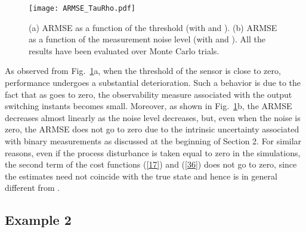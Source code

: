 \documentclass[11pt,journal,onecolumn]{IEEEtran}
\begin{document}
\begin{figure}[tb]
\centering
\texttt{[image: ARMSE\_TauRho.pdf]}
\caption{(a) ARMSE as a function of the threshold  (with  and ). (b) ARMSE as a function of the measurement noise level  (with  and ).
All the results have been evaluated over  Monte Carlo trials.}
\label{fig:ARMSE}
\end{figure}
As observed from Fig.~\ref{fig:ARMSE}a, when the threshold of the sensor is close to zero, performance undergoes a substantial deterioration.
Such a behavior is due to the fact that as  goes to zero, the observability measure  associated with the output switching instants becomes small. Moreover, as shown in Fig.~\ref{fig:ARMSE}b, the ARMSE decreases almost linearly as the noise level decreases, but, even when the noise is zero, the ARMSE does not go to zero due to the intrinsic uncertainty associated with binary measurements as discussed at the beginning of Section 2.
For similar reasons, even if the process disturbance is taken equal to zero in the simulations, the second term of the cost functions (\ref{17}) and (\ref{36}) does not go to zero, since the estimates need not coincide with the true state
and hence  is in general different from .

\subsection*{Example 2}
\end{document}
